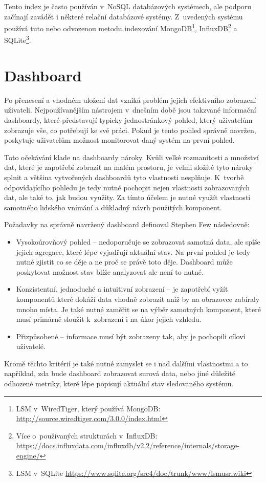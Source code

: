Tento index je často používán v~NoSQL databázových systémech, ale podporu začínají zavádět i některé relační databázové systémy. Z~uvedených systému používá tuto nebo odvozenou metodu indexování MongoDB\footnote{LSM v~WiredTiger, který používá MongoDB: \url{http://source.wiredtiger.com/3.0.0/index.html}}, InfluxDB\footnote{Více o~používaných strukturách v~InfluxDB: \url{https://docs.influxdata.com/influxdb/v2.2/reference/internals/storage-engine/}} a SQLite\footnote{LSM v~SQLite \url{https://www.sqlite.org/src4/doc/trunk/www/lsmusr.wiki}}.

\chapter{Dashboard}
\label{chapter_dashboard}
Po přenesení a vhodném uložení dat vzniká problém jejich efektivního zobrazení uživateli. Nejpoužívanějším nástrojem v~dnešním době jsou takzvané informační dashboardy, které představují typicky jednostránkový pohled, který uživatelům zobrazuje vše, co potřebují ke své práci. Pokud je tento pohled správně navržen, poskytuje uživatelům možnost monitorovat daný systém na první pohled. 

Toto očekávání klade na dashboardy nároky. Kvůli velké rozmanitosti a množství dat, které je zapotřebí zobrazit na malém prostoru, je velmi složité tyto nároky splnit a většina vytvořených dashboardů tyto vlastnosti nesplňuje. K~tvorbě odpovídajícího pohledu je tedy nutné pochopit nejen vlastnosti zobrazovaných dat, ale také to, jak budou využity. Za tímto účelem je nutné využít vlastnosti samotného lidského vnímání a důkladný návrh použitých komponent.

Požadavky na správně navržený dashboard definoval Stephen Few \cite{few2004dashboard} následovně:
\begin{itemize}
\item Vysokoúrovňový pohled -- nedoporučuje se zobrazovat samotná data, ale spíše jejich agregace, které lépe vyjadřují aktuální stav. Na první pohled je tedy nutné zjistit co se děje a ne proč se právě toto děje. Dashboard může poskytovat možnost stav blíže analyzovat ale není to nutné.
\item Konzistentní, jednoduché a intuitivní zobrazení -- je zapotřebí vyžít komponentů které dokáží data vhodně zobrazit aniž by na obrazovce zabíraly mnoho místa. Je také nutné zaměřit se na výběr samotných komponent, které musí primárně sloužit k~zobrazení i na úkor jejich vzhledu.
\item Přizpůsobené -- informace musí být zobrazeny tak, aby je pochopili cíloví uživatelé.
\end{itemize}
Kromě těchto kritérií je také nutné zamyslet se i nad dalšími vlastnostmi a to například, zda bude dashboard zobrazovat surová data, nebo jiné důležité odhozené metriky, které lépe popisují aktuální stav sledovaného systému.

